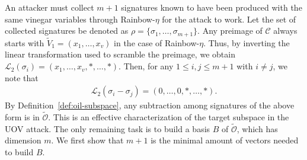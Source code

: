 \documentclass[12pt, a4paper, oneside]{memoir}
\theoremstyle{definition}
\begin{document}
An attacker must collect $m + 1$ signatures known to have been produced with the same vinegar variables through Rainbow-$\eta$ for the attack to work. Let the set of collected signatures be denoted as $\rho = \{\sigma_{1}, \dots, \sigma_{m + 1}\}$. Any preimage of $\mathcal{C}$ always starts with $\widetilde{V}_{1} = (x_{1}, \dots, x_{v})$ in the case of Rainbow-$\eta$. Thus, by inverting the linear transformation used to scramble the preimage, we obtain $\mathcal{L}_{2}(\sigma_{i}) = (x_{1}, \dots, x_{v}, \ast, \dots, \ast)$. Then, for any $1 \leq i, j \leq m + 1$ with $i \neq j$, we note that
\begin{align*}
  \mathcal{L}_{2}(\sigma_{i} - \sigma_{j}) = (0, \dots, 0, \ast, \dots, \ast).
\end{align*}
By Definition~\ref{def:oil-subspace}, any subtraction among signatures of the above form is in $\widetilde{\mathcal{O}}$. This is an effective characterization of the target subspace in the UOV attack. The only remaining task is to build a basis $B$ of $\widetilde{\mathcal{O}}$, which has dimension $m$. We first show that $m + 1$ is the minimal amount of vectors needed to build $B$.
\end{document}
